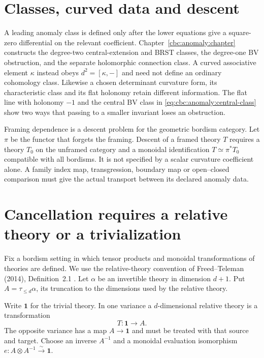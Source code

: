 \section{Classes, curved data and descent}

A leading anomaly class is defined only after the lower equations give a square-zero differential on the relevant coefficient.
Chapter~\ref{cbc:anomaly:chapter} constructs the degree-two central-extension and BRST classes, the degree-one BV obstruction, and the separate holomorphic connection class.
A curved associative element $\kappa$ instead obeys $d^2=[\kappa,-]$ and need not define an ordinary cohomology class.
Likewise a chosen determinant curvature form, its characteristic class and its flat holonomy retain different information.
The flat line with holonomy $-1$ and the central BV class in \eqref{eq:cbc:anomaly:central-class} show two ways that passing to a smaller invariant loses an obstruction.

Framing dependence is a descent problem for the geometric bordism category.
Let $\pi$ be the functor that forgets the framing.
Descent of a framed theory $T$ requires a theory $T_0$ on the unframed category and a monoidal identification $T\simeq\pi^*T_0$ compatible with all bordisms.
It is not specified by a scalar curvature coefficient alone.
A family index map, transgression, boundary map or open--closed comparison must give the actual transport between its declared anomaly data.

\section{Cancellation requires a relative theory or a trivialization}

Fix a bordism setting in which tensor products and monoidal transformations of theories are defined.
We use the relative-theory convention of Freed--Teleman (2014), Definition~2.1 \cite{FreedTeleman2014}.
Let $\alpha$ be an invertible theory in dimension $d+1$.
Put $A=\tau_{\leq d}\alpha$, its truncation to the dimensions used by the relative theory.

Write $\mathbf1$ for the trivial theory.
In one variance a $d$-dimensional relative theory is a transformation
\[
 T:\mathbf1\longrightarrow A.
\]
The opposite variance has a map $A\to\mathbf1$ and must be treated with that source and target.
Choose an inverse $A^{-1}$ and a monoidal evaluation isomorphism $e:A\otimes A^{-1}\xrightarrow{\sim}\mathbf1$.

